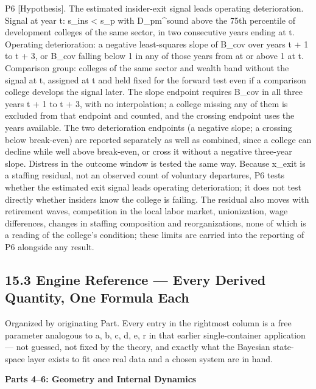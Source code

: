 \documentclass[
]{article}
\begin{document}
P6 {[}Hypothesis{]}. The estimated insider-exit signal leads operating
deterioration. Signal at year t: s\_ins \textless{} s\_p with
D\_pm\^{}sound above the 75th percentile of development colleges of the
same sector, in two consecutive years ending at t. Operating
deterioration: a negative least-squares slope of B\_cov over years t + 1
to t + 3, or B\_cov falling below 1 in any of those years from at or
above 1 at t. Comparison group: colleges of the same sector and wealth
band without the signal at t, assigned at t and held fixed for the
forward test even if a comparison college develops the signal later. The
slope endpoint requires B\_cov in all three years t + 1 to t + 3, with
no interpolation; a college missing any of them is excluded from that
endpoint and counted, and the crossing endpoint uses the years
available. The two deterioration endpoints (a negative slope; a crossing
below break-even) are reported separately as well as combined, since a
college can decline while well above break-even, or cross it without a
negative three-year slope. Distress in the outcome window is tested the
same way. Because x\_exit is a staffing residual, not an observed count
of voluntary departures, P6 tests whether the estimated exit signal
leads operating deterioration; it does not test directly whether
insiders know the college is failing. The residual also moves with
retirement waves, competition in the local labor market, unionization,
wage differences, changes in staffing composition and reorganizations,
none of which is a reading of the college's condition; these limits are
carried into the reporting of P6 alongside any result.

\hypertarget{engine-reference-every-derived-quantity-one-formula-each}{%
\subsection{15.3 Engine Reference --- Every Derived Quantity, One
Formula
Each}\label{engine-reference-every-derived-quantity-one-formula-each}}

Organized by originating Part. Every entry in the rightmost column is a
free parameter analogous to a, b, c, d, e, r in that earlier
single-container application --- not guessed, not fixed by the theory,
and exactly what the Bayesian state-space layer exists to fit once real
data and a chosen system are in hand.

\textbf{Parts 4--6: Geometry and Internal Dynamics}
\end{document}
